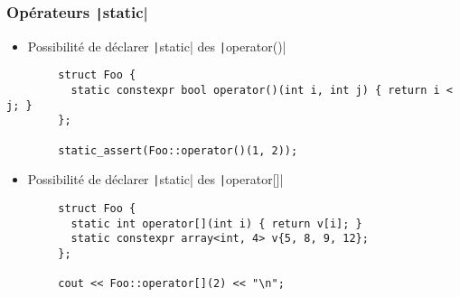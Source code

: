 \documentclass[C++.tex]{subfiles}
\begin{document}
\begin{frame}[fragile]
\end{frame}

\begin{frame}[fragile]
	\frametitle{Opérateurs \texttt|static|}
	 \begin{itemize}
	 	\item Possibilité de déclarer \texttt|static| des \texttt|operator()|
	 \end{itemize}

 	\begin{verbatim}
		struct Foo {
		  static constexpr bool operator()(int i, int j) { return i < j; }
		};

		static_assert(Foo::operator()(1, 2));
	\end{verbatim}

	 \begin{itemize}
	 	\item Possibilité de déclarer \texttt|static| des \texttt|operator[]|
	 \end{itemize}

 	\begin{verbatim}
		struct Foo {
		  static int operator[](int i) { return v[i]; }
		  static constexpr array<int, 4> v{5, 8, 9, 12};
		};

		cout << Foo::operator[](2) << "\n";
	\end{verbatim}


\end{frame}
\end{document}
